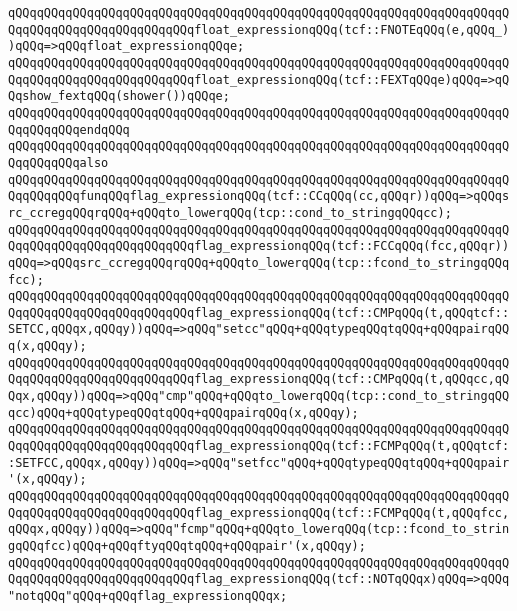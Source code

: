 \verb|qQQqqQQqqQQqqQQqqQQqqQQqqQQqqQQqqQQqqQQqqQQqqQQqqQQqqQQqqQQqqQQqqQQqqQQqqQQqqQQqqQQqqQQqqQQqqQQqfloat_expressionqQQq(tcf::FNOTEqQQq(e,qQQq_))qQQq=>qQQqfloat_expressionqQQqe;|\newline
\verb|qQQqqQQqqQQqqQQqqQQqqQQqqQQqqQQqqQQqqQQqqQQqqQQqqQQqqQQqqQQqqQQqqQQqqQQqqQQqqQQqqQQqqQQqqQQqqQQqfloat_expressionqQQq(tcf::FEXTqQQqe)qQQq=>qQQqshow_fextqQQq(shower())qQQqe;|\newline
\verb|qQQqqQQqqQQqqQQqqQQqqQQqqQQqqQQqqQQqqQQqqQQqqQQqqQQqqQQqqQQqqQQqqQQqqQQqqQQqqQQqendqQQq|\newline
\newline
\verb|qQQqqQQqqQQqqQQqqQQqqQQqqQQqqQQqqQQqqQQqqQQqqQQqqQQqqQQqqQQqqQQqqQQqqQQqqQQqqQQqalso|\newline
\verb|qQQqqQQqqQQqqQQqqQQqqQQqqQQqqQQqqQQqqQQqqQQqqQQqqQQqqQQqqQQqqQQqqQQqqQQqqQQqqQQqfunqQQqflag_expressionqQQq(tcf::CCqQQq(cc,qQQqr))qQQq=>qQQqsrc_ccregqQQqrqQQq+qQQqto_lowerqQQq(tcp::cond_to_stringqQQqcc);|\newline
\verb|qQQqqQQqqQQqqQQqqQQqqQQqqQQqqQQqqQQqqQQqqQQqqQQqqQQqqQQqqQQqqQQqqQQqqQQqqQQqqQQqqQQqqQQqqQQqqQQqflag_expressionqQQq(tcf::FCCqQQq(fcc,qQQqr))qQQq=>qQQqsrc_ccregqQQqrqQQq+qQQqto_lowerqQQq(tcp::fcond_to_stringqQQqfcc);|\newline
\verb|qQQqqQQqqQQqqQQqqQQqqQQqqQQqqQQqqQQqqQQqqQQqqQQqqQQqqQQqqQQqqQQqqQQqqQQqqQQqqQQqqQQqqQQqqQQqqQQqflag_expressionqQQq(tcf::CMPqQQq(t,qQQqtcf::SETCC,qQQqx,qQQqy))qQQq=>qQQq"setcc"qQQq+qQQqtypeqQQqtqQQq+qQQqpairqQQq(x,qQQqy);|\newline
\verb|qQQqqQQqqQQqqQQqqQQqqQQqqQQqqQQqqQQqqQQqqQQqqQQqqQQqqQQqqQQqqQQqqQQqqQQqqQQqqQQqqQQqqQQqqQQqqQQqflag_expressionqQQq(tcf::CMPqQQq(t,qQQqcc,qQQqx,qQQqy))qQQq=>qQQq"cmp"qQQq+qQQqto_lowerqQQq(tcp::cond_to_stringqQQqcc)qQQq+qQQqtypeqQQqtqQQq+qQQqpairqQQq(x,qQQqy);|\newline
\verb|qQQqqQQqqQQqqQQqqQQqqQQqqQQqqQQqqQQqqQQqqQQqqQQqqQQqqQQqqQQqqQQqqQQqqQQqqQQqqQQqqQQqqQQqqQQqqQQqflag_expressionqQQq(tcf::FCMPqQQq(t,qQQqtcf::SETFCC,qQQqx,qQQqy))qQQq=>qQQq"setfcc"qQQq+qQQqtypeqQQqtqQQq+qQQqpair'(x,qQQqy);|\newline
\verb|qQQqqQQqqQQqqQQqqQQqqQQqqQQqqQQqqQQqqQQqqQQqqQQqqQQqqQQqqQQqqQQqqQQqqQQqqQQqqQQqqQQqqQQqqQQqqQQqflag_expressionqQQq(tcf::FCMPqQQq(t,qQQqfcc,qQQqx,qQQqy))qQQq=>qQQq"fcmp"qQQq+qQQqto_lowerqQQq(tcp::fcond_to_stringqQQqfcc)qQQq+qQQqftyqQQqtqQQq+qQQqpair'(x,qQQqy);|\newline
\verb|qQQqqQQqqQQqqQQqqQQqqQQqqQQqqQQqqQQqqQQqqQQqqQQqqQQqqQQqqQQqqQQqqQQqqQQqqQQqqQQqqQQqqQQqqQQqqQQqflag_expressionqQQq(tcf::NOTqQQqx)qQQq=>qQQq"notqQQq"qQQq+qQQqflag_expressionqQQqx;|\newline
